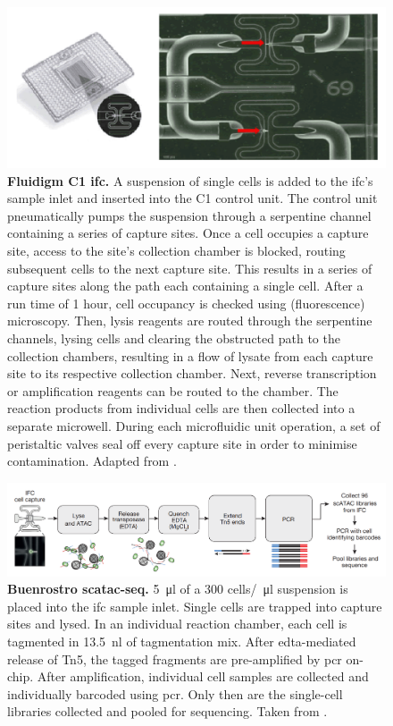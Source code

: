
\begin{figure}[ht]
	\centerfloat
	\includegraphics[width=12cm]{./ims/c1.png}
	\caption[Fluidigm C1 \acrshort{ifc}]{\textbf{Fluidigm C1 \acrshort{ifc}.} A suspension of single cells is added to the \acrshort{ifc}'s sample inlet and inserted into the C1 control unit. The control unit pneumatically pumps the suspension through a serpentine channel containing a series of capture sites. Once a cell occupies a capture site, access to the site's collection chamber is blocked, routing subsequent cells to the next capture site. This results in a series of capture sites along the path each containing a single cell. After a run time of 1 hour, cell occupancy is checked using (fluorescence) microscopy. Then, lysis reagents are routed through the serpentine channels, lysing cells and clearing the obstructed path to the collection chambers, resulting in a flow of lysate from each capture site to its respective collection chamber. Next, reverse transcription or amplification reagents can be routed to the chamber. The reaction products from individual cells are then collected into a separate microwell. During each microfluidic unit operation, a set of peristaltic valves seal off every capture site in order to minimise contamination. Adapted from \cite{azizi2014}.}
	\label{fig:c1}
\end{figure}

\begin{figure}[ht]
	\centerfloat
	\includegraphics[width=\textwidth]{./ims/buenrostro2015.png}
	\caption[Buenrostro \acrshort{scatac-seq}]{\textbf{Buenrostro \acrshort{scatac-seq}.} \SI{5}{\micro\litre} of a 300 cells/\SI{}{\micro\litre} suspension is placed into the \acrshort{ifc} sample inlet. Single cells are trapped into capture sites and lysed. In an individual reaction chamber, each cell is tagmented in \SI{13.5}{\nano\litre} of tagmentation mix. After \acrshort{edta}-mediated release of Tn5, the tagged fragments are pre-amplified by \acrshort{pcr} on-chip. After amplification, individual cell samples are collected and individually barcoded using \acrshort{pcr}. Only then are the single-cell libraries collected and pooled for sequencing. Taken from \cite{buenrostro2015}.}
	\label{fig:buenrostro2015}
\end{figure}

